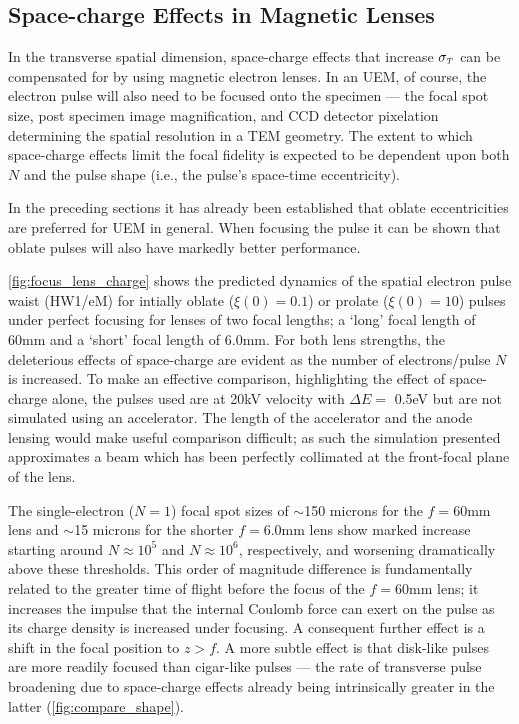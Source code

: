 \subsection{Space-charge Effects in Magnetic Lenses} \label{sec:mag_lens_charge}

In the transverse spatial dimension, space-charge effects that increase $ \sigma_{ {\scriptscriptstyle T} } $ can be compensated for by using magnetic electron lenses.\cite{oudheusden_electron_2007,lagrange_nanosecond_2008}
In an UEM, of course, the electron pulse will also need to be focused onto the specimen --- the focal spot size, post specimen image magnification, and CCD detector pixelation determining the spatial resolution in a TEM geometry.\cite{berger_dc_2009}
The extent to which space-charge effects limit the focal fidelity is expected to be dependent upon both $N$ and the pulse shape (i.e., the pulse's space-time eccentricity).

In the preceding sections it has already been established that oblate eccentricities are preferred for UEM in general.
When focusing the pulse it can be shown that oblate pulses will also have markedly better performance.



\ref{fig:focus_lens_charge} shows the predicted dynamics of the spatial electron pulse waist (HW1/eM) for intially oblate ($ \xi ( 0 ) = 0.1 $) or prolate ($ \xi ( 0 ) = 10 $) pulses under perfect focusing for lenses of two focal lengths; a `long' focal length of 60mm and a `short' focal length of 6.0mm.
For both lens strengths, the deleterious effects of space-charge are evident as the number of electrons/pulse $ N $ is increased.
To make an effective comparison, highlighting the effect of space-charge alone, the pulses used are at 20kV velocity with $\Delta E = $ 0.5eV but are not simulated using an accelerator.
The length of the accelerator and the anode lensing would make useful comparison difficult; as such the simulation presented approximates a beam which has been perfectly collimated at the front-focal plane of the lens.

The single-electron ($ N = 1 $) focal spot sizes of $\sim$150 microns for the $ f = 60 \text{mm} $ lens and $\sim$15 microns for the shorter $ f = 6.0 \text{mm} $ lens show marked increase starting around $ N \approx 10^{ 5 } $ and $ N \approx 10^{ 6 }$, respectively, and worsening dramatically above these thresholds.
This order of magnitude difference is fundamentally related to the greater time of flight before the focus of the $ f = 60\text{mm} $ lens; it increases the impulse that the internal Coulomb force can exert on the pulse as its charge density is increased under focusing.
A consequent further effect is a shift in the focal position to $ z > f $.
A more subtle effect is that disk-like pulses are more readily focused than cigar-like pulses --- the rate of transverse pulse broadening due to space-charge effects already being intrinsically greater in the latter (\ref{fig:compare_shape}).

